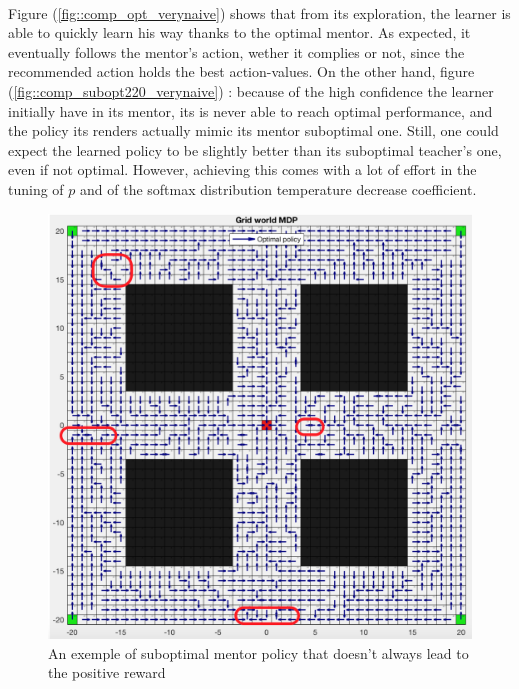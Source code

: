 \documentclass[a4paper]{report}
\begin{document}
{{{			\paragraph{} Figure (\ref{fig::comp_opt_verynaive}) shows that from its exploration, the learner is able to quickly learn his way thanks to the optimal mentor. As expected, it eventually follows the mentor's action, wether it complies or not, since the recommended action holds the best action-values. On the other hand, figure (\ref{fig::comp_subopt220_verynaive}) : because of the high confidence the learner initially have in its mentor, its is never able to reach optimal performance, and the policy its renders actually mimic its mentor suboptimal one. Still, one could expect the learned policy to be slightly better than its suboptimal teacher's one, even if not optimal. However, achieving this comes with a lot of effort in the tuning of $p$ and of the softmax distribution temperature decrease coefficient. 
	
			\begin{figure}[h!]
				\begin{center}
					\includegraphics[width=0.7\linewidth]{subopt_policy_block}
					\caption{An exemple of suboptimal mentor policy that doesn't always lead to the positive reward}
					\label{subopt_policy_block}
				\end{center}
			\end{figure}
			
}}}
\end{document}
